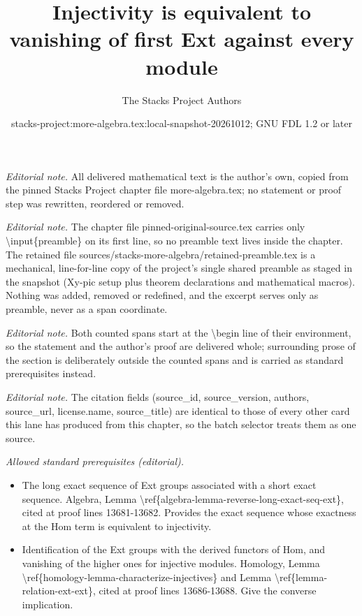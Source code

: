 \documentclass[10pt,a4paper]{amsart}
\title{Injectivity is equivalent to vanishing of first Ext against every module}
\author{The Stacks Project Authors}
\date{stacks-project:more-algebra.tex:local-snapshot-20261012; GNU FDL 1.2 or later}
\theoremstyle{plain}
\theoremstyle{definition}
\theoremstyle{remark}
\numberwithin{equation}{subsection}
\begin{document}
\maketitle
\setcounter{subsection}{1}
\noindent\textit{Editorial note.} All delivered mathematical text is the author's own, copied from the pinned Stacks Project chapter file more-algebra.tex; no statement or proof step was rewritten, reordered or removed.\par\medskip
\noindent\textit{Editorial note.} The chapter file pinned-original-source.tex carries only \textbackslash{}input\{preamble\} on its first line, so no preamble text lives inside the chapter. The retained file sources/stacks-more-algebra/retained-preamble.tex is a mechanical, line-for-line copy of the project's single shared preamble as staged in the snapshot (Xy-pic setup plus theorem declarations and mathematical macros). Nothing was added, removed or redefined, and the excerpt serves only as preamble, never as a span coordinate.\par\medskip
\noindent\textit{Editorial note.} Both counted spans start at the \textbackslash{}begin line of their environment, so the statement and the author's proof are delivered whole; surrounding prose of the section is deliberately outside the counted spans and is carried as standard prerequisites instead.\par\medskip
\noindent\textit{Editorial note.} The citation fields (source\_id, source\_version, authors, source\_url, license.name, source\_title) are identical to those of every other card this lane has produced from this chapter, so the batch selector treats them as one source.\par\medskip
\noindent\textit{Allowed standard prerequisites (editorial).}\begin{itemize}
\item The long exact sequence of Ext groups associated with a short exact sequence. Algebra, Lemma \textbackslash{}ref\{algebra-lemma-reverse-long-exact-seq-ext\}, cited at proof lines 13681-13682. Provides the exact sequence whose exactness at the Hom term is equivalent to injectivity.
\item Identification of the Ext groups with the derived functors of Hom, and vanishing of the higher ones for injective modules. Homology, Lemma \textbackslash{}ref\{homology-lemma-characterize-injectives\} and Lemma \textbackslash{}ref\{lemma-relation-ext-ext\}, cited at proof lines 13686-13688. Give the converse implication.
\end{itemize}\medskip
\end{document}
